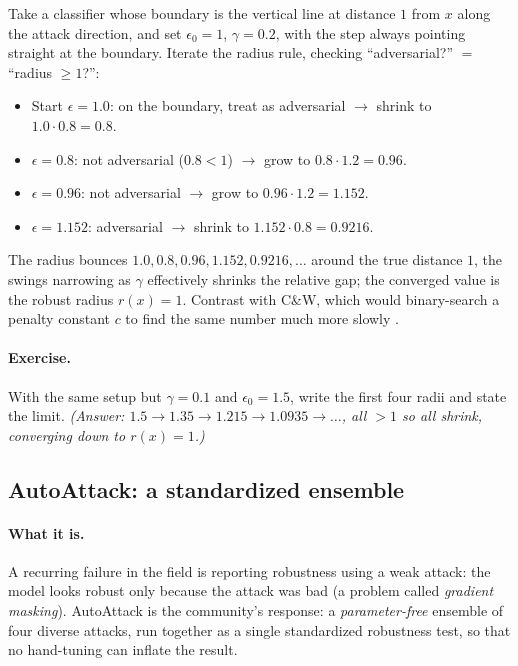 \begin{example}
Take a classifier whose boundary is the vertical line at distance $1$ from $x$ along the attack direction, and set $\epsilon_0=1$, $\gamma=0.2$, with the step always pointing straight at the boundary. Iterate the radius rule, checking ``adversarial?'' $=$ ``radius $\ge1$?'':
\begin{itemize}[nosep]
  \item Start $\epsilon=1.0$: on the boundary, treat as adversarial $\to$ shrink to $1.0\cdot0.8 = 0.8$.
  \item $\epsilon=0.8$: not adversarial ($0.8<1$) $\to$ grow to $0.8\cdot1.2 = 0.96$.
  \item $\epsilon=0.96$: not adversarial $\to$ grow to $0.96\cdot1.2 = 1.152$.
  \item $\epsilon=1.152$: adversarial $\to$ shrink to $1.152\cdot0.8 = 0.9216$.
\end{itemize}
The radius bounces $1.0,0.8,0.96,1.152,0.9216,\dots$ around the true distance $1$, the swings narrowing as $\gamma$ effectively shrinks the relative gap; the converged value is the robust radius $r(x)=1$. Contrast with C\&W, which would binary-search a penalty constant $c$ to find the same number much more slowly \citep{rony2019decoupling}.
\end{example}

\paragraph{Exercise.} With the same setup but $\gamma=0.1$ and $\epsilon_0=1.5$, write the first four radii and state the limit. \emph{(Answer: $1.5\to1.35\to1.215\to1.0935\to\dots$, all $>1$ so all shrink, converging down to $r(x)=1$.)}

\subsection{AutoAttack: a standardized ensemble}
\label{sub:autoattack}

\paragraph{What it is.} A recurring failure in the field is reporting robustness using a weak attack: the model looks robust only because the attack was bad (a problem called \emph{gradient masking}). AutoAttack \citep{croce2020reliable} is the community's response: a \emph{parameter-free} ensemble of four diverse attacks, run together as a single standardized robustness test, so that no hand-tuning can inflate the result.

